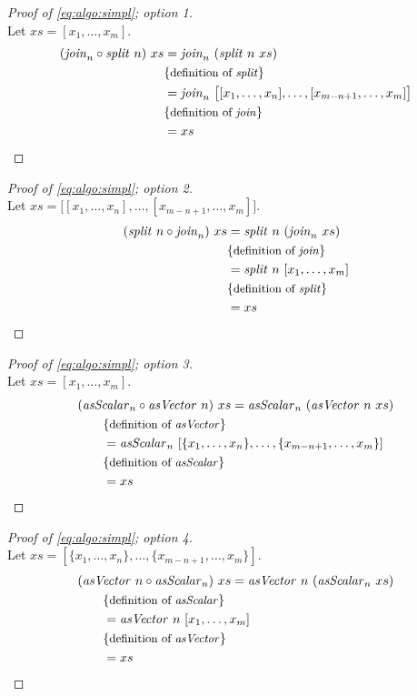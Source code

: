 \begin{proof}[Proof of \autoref{eq:algo:simpl}; option 1]\strut\\
  Let $xs = [x_1, \ldots, x_m]$.
  \begin{align*}
    (\text{\textit{join}}_n \circ \text{\textit{split}}\ n)\ xs &= \text{\textit{join}}_n\ (\text{\textit{split}}\ n\ xs)\\
      &\{\text{\small definition of \text{\textit{split}}}\}\\
      &= \text{\textit{join}}_n\ \big[ [x_1, \ldots, x_n], \ldots, [x_{m-n+1}, \ldots, x_m]\big]\\
      &\{\text{\small definition of \text{\textit{join}}}\}\\
      &= xs
  \end{align*}
\end{proof}
\begin{proof}[Proof of \autoref{eq:algo:simpl}; option 2]\strut\\
  Let $xs = \big[ [x_1, \ldots, x_n], \ldots, [x_{m-n+1}, \ldots, x_m]\big]$.
  \begin{align*}
    (\text{\textit{split}}\ n \circ \text{\textit{join}}_n)\ xs &= \text{\textit{split}}\ n\ (\text{\textit{join}}_n\ xs)\\
      &\{\text{\small definition of \text{\textit{join}}}\}\\
      &= \text{\textit{split}}\ n\ [x_1, \ldots, x_m]\\
      &\{\text{\small definition of \text{\textit{split}}}\}\\
      &= xs
  \end{align*}
\end{proof}
\begin{proof}[Proof of \autoref{eq:algo:simpl}; option 3]\strut\\
  Let $xs = [x_1, \ldots, x_m]$.
  \begin{align*}
    &(\asScalar_n \circ \asVector\ n)\ xs = \asScalar_n\ (\asVector\ n\ xs)\\
    &\qquad\comment{definition of \asVector}\\
    &\qquad = \asScalar_n\ [\{x_1, \ldots, x_n\}, \ldots, \{x_{m-n+1}, \ldots, x_{m}\}]\\
    &\qquad\comment{definition of \asScalar}\\
    &\qquad = xs
  \end{align*}
\end{proof}
\begin{proof}[Proof of \autoref{eq:algo:simpl}; option 4]\strut\\
  Let $xs = [\{x_1, \ldots, x_n\}, \ldots, \{x_{m-n+1}, \ldots, x_{m}\}]$.
  \begin{align*}
    &(\asVector\ n \circ \asScalar_n)\ xs = \asVector\ n\ (\asScalar_n\ xs)\\
    &\qquad\comment{definition of \asScalar}\\
    &\qquad = \asVector\ n\ [x_1, \ldots, x_m]\\
    &\qquad\comment{definition of \asVector}\\
    &\qquad = xs
  \end{align*}
\end{proof}

